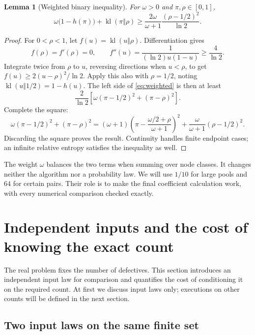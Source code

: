 \documentclass[11pt]{article}
\newtheorem{lemma}[theorem]{Lemma}
\theoremstyle{definition}
\theoremstyle{remark}
\newcommand{\kl}{\operatorname{kl}}
\numberwithin{equation}{section}
\begin{document}
\begin{lemma}[Weighted binary inequality]\label{lem:weighted}
For \(\omega>0\) and \(\pi,\rho\in[0,1]\),
\begin{equation}\label{eq:weighted}
 \omega\bigl(1-h(\pi)\bigr)+\kl(\pi\Vert\rho)
 \ge\frac{2\omega}{\omega+1}\frac{(\rho-1/2)^2}{\ln2}.
\end{equation}
\end{lemma}
\begin{proof}
For \(0<\rho<1\), let \(f(u)=\kl(u\Vert\rho)\). Differentiation gives
\[
 f(\rho)=f'(\rho)=0,\qquad
 f''(u)=\frac1{(\ln2)u(1-u)}\ge\frac4{\ln2}.
\]
Integrate twice from \(\rho\) to \(u\), reversing directions when
\(u<\rho\), to get \(f(u)\ge2(u-\rho)^2/\ln2\).
Apply this also with \(\rho=1/2\), noting
\(\kl(u\Vert1/2)=1-h(u)\). The left side of \eqref{eq:weighted}
is then at least
\[
 \frac2{\ln2}\left[\omega(\pi-1/2)^2+(\pi-\rho)^2\right].
\]
Complete the square:
\[
 \omega(\pi-1/2)^2+(\pi-\rho)^2
 =(\omega+1)\left(\pi-\frac{\omega/2+\rho}{\omega+1}\right)^2
  +\frac{\omega}{\omega+1}(\rho-1/2)^2.
\]
Discarding the square proves the result. Continuity handles finite
endpoint cases; an infinite relative entropy satisfies the inequality
as well.
\end{proof}

The weight \(\omega\) balances the two terms when summing over node
classes. It changes neither the algorithm nor a probability law.
We will use \(1/10\) for large pools and \(64\) for certain pairs.
Their role is to make the final coefficient calculation work, with
every numerical comparison checked exactly.

\section{Independent inputs and the cost of knowing the exact count}
\label{sec:product}

The real problem fixes the number of defectives. This section introduces
an independent input law for comparison and quantifies the cost of
conditioning it on the required count. At first we discuss input laws
only; executions on other counts will be defined in the next section.

\subsection{Two input laws on the same finite set}
\end{document}
